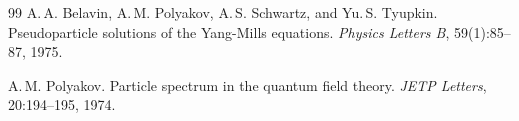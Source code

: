 \documentclass[12pt,a4paper]{article}
\begin{document}
\begin{thebibliography}{99}
	A.\,A. Belavin, A.\,M. Polyakov, A.\,S. Schwartz, and Yu.\,S. Tyupkin.
	\newblock Pseudoparticle solutions of the Yang-Mills equations.
	\newblock \textit{Physics Letters B}, 59(1):85--87, 1975.
	
	A.\,M. Polyakov.
	\newblock Particle spectrum in the quantum field theory.
	\newblock \textit{JETP Letters}, 20:194--195, 1974.
	
\end{thebibliography}
	
\end{document}
